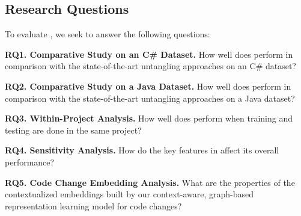 \subsection{Research Questions}

To evaluate {\tool}, we seek to answer the following questions:

\noindent\textbf{RQ1. Comparative Study on an C\# Dataset.}  How well
does {\tool} perform in comparison with the state-of-the-art
untangling approaches on an C\# dataset?

\noindent\textbf{RQ2. Comparative Study on a Java Dataset.}  How well
does {\tool} perform in comparison with the state-of-the-art
untangling approaches on a Java dataset?

\noindent\textbf{RQ3. Within-Project Analysis.}  How well does {\tool}
perform when training and testing are done in the same project?


\noindent\textbf{RQ4. Sensitivity Analysis.} How do the key features
in {\tool} affect its overall performance?

\noindent\textbf{RQ5. Code Change Embedding Analysis.} What are the
properties of the contextualized embeddings built by our
context-aware, graph-based representation learning model for code
changes?
